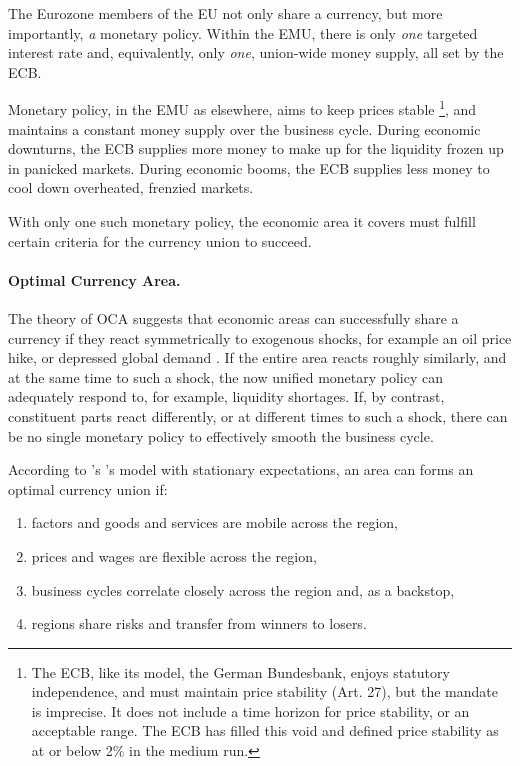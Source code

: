 \documentclass[11pt,a4paper,oneside]{article}
\begin{document}
The Eurozone members of the \gls{EU} not only share a currency, but more importantly, \emph{a} monetary policy. 
Within the \gls{EMU}, there is only \emph{one} targeted interest rate and, equivalently, only \emph{one}, union-wide money supply, all set by the \gls{ECB}.

Monetary policy, in the \gls{EMU} as elsewhere, aims to keep prices stable\ignorespaces
\footnote{
	The \gls{ECB}, like its model, the German Bundesbank, enjoys statutory independence, and must maintain price stability (Art. 27), but the mandate is imprecise. 
	It does not include a time horizon for price stability, or an acceptable range.	
	The \gls{ECB} has filled this void and defined price stability as at or below 2\% in the medium run.
}, 
and maintains a constant money supply over the business cycle. 
During economic downturns, the \gls{ECB} supplies more money to make up for the liquidity frozen up in panicked markets. 
During economic booms, the \gls{ECB} supplies less money to cool down overheated, frenzied markets. 

With only one such monetary policy, the economic area it covers must fulfill certain criteria for the currency union to succeed.

\paragraph{Optimal Currency Area.}  \label{sec:OCA} The theory of \gls{OCA} suggests that economic areas can successfully share a currency if they react symmetrically to exogenous shocks, for example an oil price hike, or depressed global demand \citep{Mundell1961}. 
If the entire area reacts roughly similarly, and at the same time to such a shock, the now unified monetary policy can adequately respond to, for example, liquidity shortages. 
If, by contrast, constituent parts react differently, or at different times to such a shock, there can be no single monetary policy to effectively smooth the business cycle.

According to \citeauthor{Mundell1961}'s \citeyearpar{Mundell1961}'s  model with stationary expectations, an area can forms an optimal currency union if:
\begin{enumerate}
	\item factors and goods and services are mobile across the region, 
	\item prices and wages are flexible across the region,
	\item business cycles correlate closely across the region and, as a backstop,
	\item regions share risks and transfer from winners to losers.
\end{enumerate}
\end{document}
